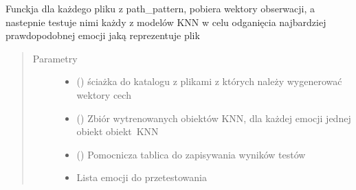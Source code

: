 \documentclass[letterpaper,10pt,polish]{sphinxmanual}
\begin{document}
\begin{fulllineitems}
\label{\detokenize{knn_main:knn_main.knn_compute_emotions}}
Funckja dla każdego pliku z path\_pattern, pobiera wektory obserwacji, a nastepnie testuje nimi
każdy z modelów KNN w celu odganięcia najbardziej prawdopodobnej emocji jaką reprezentuje plik
\begin{quote}\begin{description}
\item[{Parametry}] \leavevmode\begin{itemize}
\item {} 
 () \textendash{} ściażka do katalogu z plikami z których należy wygenerować wektory cech

\item {} 
 () \textendash{} Zbiór wytrenowanych obiektów KNN, dla każdej emocji jednej obiekt obiekt KNN

\item {} 
 () \textendash{} Pomocnicza tablica do zapisywania wyników testów

\item {} 
 \textendash{} Lista emocji do przetestowania

\end{itemize}

\end{description}\end{quote}

\end{fulllineitems}

\end{document}
